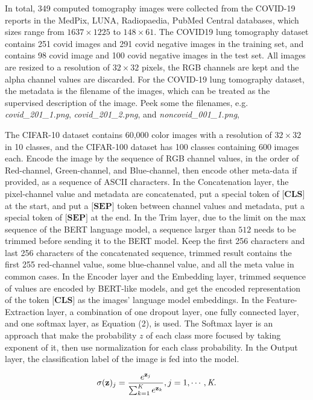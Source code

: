 \documentclass[runningheads]{llncs}
\begin{document}
\par In total, 349 computed tomography images were collected from the COVID-19 reports in the MedPix, LUNA, Radiopaedia,
PubMed Central databases, which sizes range from $1637\times1225$ to $148\times61$.
The COVID19 lung tomography dataset contains 251 covid images and 291 covid negative images in the training set,
and contains 98 covid image and 100 covid negative images in the test set.
All images are resized to a resolution of $32\times32$ pixels, the RGB channels are kept and the alpha channel values are discarded.
For the COVID-19 lung tomography dataset, the metadata is the filename of the images, which can be treated as the supervised description of the image.
Peek some the filenames, e.g. \textit{covid\_201\_1.png}, \textit{covid\_201\_2.png}, and \textit{noncovid\_001\_1.png},


\par The CIFAR-10 dataset contains 60,000 color images with a resolution of $32\times32$ in 10 classes, and the CIFAR-100 dataset has 100 classes containing 600 images each.
Encode the image by the sequence of RGB channel values, in the order of Red-channel, Green-channel, and Blue-channel,
then encode other meta-data if provided, as a sequence of ASCII characters.
In the Concatenation layer, the pixel-channel value and metadata are concatenated, put a special token of $\textbf{[CLS]}$ at the start,
and put a $\textbf{[SEP]}$ token between channel values and metadata, put a special token of $\textbf{[SEP]}$ at the end.
In the Trim layer, due to the limit on the max sequence of the BERT language model, a sequence larger than $512$ needs to be trimmed before sending it to the BERT model.
Keep the first 256 characters and last 256 characters of the concatenated sequence, trimmed result contains the first 255 red-channel value,
some blue-channel value, and all the meta value in common cases.
In the Encoder layer and the Embedding layer, trimmed sequence of values are encoded by BERT-like models,
and get the encoded representation of the token $\textbf{[CLS]}$ as the images' language model embeddings.
In the Feature-Extraction layer, a combination of one dropout layer, one fully connected layer, and one softmax layer, as Equation (2), is used.
The Softmax layer is an approach that make the probability $z$ of each class more focused by taking exponent of it, then use normalization for each class probability.
In the Output layer, the classification label of the image is fed into the model.

\begin{equation}
  \sigma(\textbf{z})_j = {e^{\textbf{z}_j} \over {\sum_{k=1}^{\textit{K}} e^{\textbf{z}_k}}}, j=1,\cdots,\textit{K}.
\end{equation}
\end{document}
